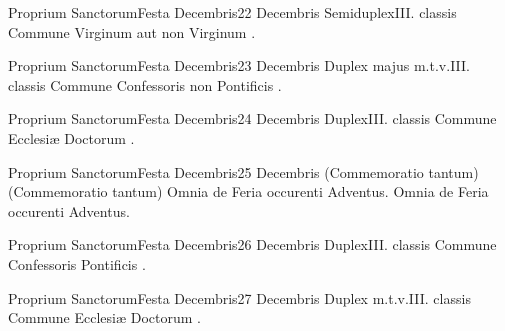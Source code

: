 \documentclass[nocturnale-romanum.tex]{subfiles}
\begin{document}

	{Proprium Sanctorum}{Festa Decembris}{2}{2 Decembris}
	{Semiduplex}{III. classis}
	{Commune Virginum aut non Virginum \pageref{M-MU}.}
	{}

	{Proprium Sanctorum}{Festa Decembris}{2}{3 Decembris}
	{Duplex majus m.t.v.}{III. classis}
	{Commune Confessoris non Pontificis \pageref{M-CONP}.}
	{}

	{Proprium Sanctorum}{Festa Decembris}{2}{4 Decembris}
	{Duplex}{III. classis}
	{Commune Ecclesiæ Doctorum \pageref{M-CODO}.}
	{}

	{Proprium Sanctorum}{Festa Decembris}{2}{5 Decembris}
	{(Commemoratio tantum)}{(Commemoratio tantum)}
	{Omnia de Feria occurenti Adventus.}
	{Omnia de Feria occurenti Adventus.}

	{Proprium Sanctorum}{Festa Decembris}{2}{6 Decembris}
	{Duplex}{III. classis}
	{Commune Confessoris Pontificis \pageref{M-COPO}.}
	{}

	{Proprium Sanctorum}{Festa Decembris}{2}{7 Decembris}
	{Duplex m.t.v.}{III. classis}
	{Commune Ecclesiæ Doctorum \pageref{M-CODO}.}
	{}
\end{document}
